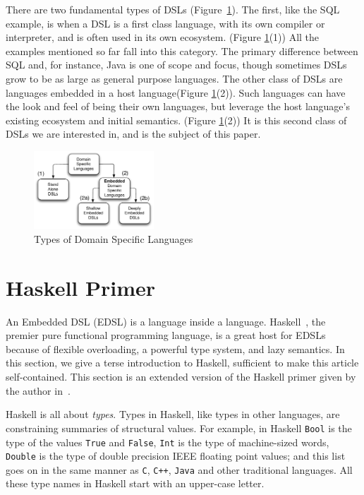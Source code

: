\documentclass[11pt]{article}
\begin{document}
There are two fundamental types of DSLs
(Figure~\ref{fig:types-of-dsls}).
%
The first, like the SQL example, is when a DSL is a first class language,
with its own compiler or interpreter, and is often used in
its own ecosystem. (Figure \ref{fig:types-of-dsls}(1)) 
All the examples mentioned so far fall
into this category. The primary difference between SQL and,
for instance, Java is one of scope and focus, though sometimes
DSLs grow to be as large as general purpose languages.
%
The other class of DSLs are languages
embedded in a host language(Figure \ref{fig:types-of-dsls}(2)). 
Such languages
can have the look and feel of being their own languages,
but leverage the host language's existing
ecosystem and initial semantics. 
(Figure \ref{fig:types-of-dsls}(2))
It is this second
class of DSLs we are interested in, and is the subject of
this paper.

\begin{figure}[!t]
  \centering        
  \includegraphics[width=0.4\textwidth]{images/TypesOfDSLs.pdf}
  \caption{Types of Domain Specific Languages}
  \label{fig:types-of-dsls}
\end{figure}
        
\section{Haskell Primer}

An Embedded DSL (EDSL) is a language inside a language.
Haskell~\cite{Haskell98Book}, the premier pure functional programming language, is a great host for EDSLs
because of flexible overloading, a powerful type system, and lazy semantics.
In this section, we give a terse
introduction to Haskell, 
sufficient to make this article self-contained. This section
is an extended version of the Haskell primer given by the author in~\cite{Gill:11:Declarative}.

Haskell is all about {\em types\/}. Types in Haskell, like
types in other languages, are constraining summaries of structural values.
For example, in Haskell \verb|Bool| is the type of the values
\verb|True| and \verb|False|, \verb|Int| is the type of machine-sized
words, \verb|Double| is the type of double precision IEEE floating
point values; and this list goes on in the same manner as
\verb|C|, \verb|C++|, \verb|Java| and other traditional languages.
All these type names in Haskell start with an upper-case letter.
\end{document}
